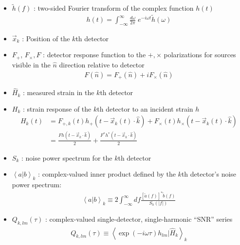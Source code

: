 \documentclass[twocolumn,prd,nofootinbib]{revtex4}
\newcommand\qmstateproduct[2]{\left\langle#1|#2\right\rangle}
\begin{document}
\begin{itemize}
\item 
$\tilde{h}(f)$ : two-sided Fourier transform of the complex function $h(t)$
\begin{eqnarray}
h(t) = \int_{-\infty}^{\infty} \frac{d \omega}{2\pi} \; e^{-i\omega t} \tilde{h}(\omega) 
\end{eqnarray}



\item 
$\vec{x}_k$ : Position of the $k$th detector

\item 
$F_{+}$, $F_{\times},F$ : detector response function  to the $+,\times$ polarizations for sources visible in the
  $\hat{n}$ direction relative to detector
\begin{eqnarray}
F(\hat{n}) = F_+(\hat{n}) +i F_\times(\hat{n})
\end{eqnarray}

\item 
$\hat{H}_k$ : measured strain in  the $k$th detector

\item 
$H_k$ : strain response of the $k$th detector to an incident strain $h$
\begin{align}
H_k(t) &=F_{+,k}(t) h_+(t-\vec{x}_k(t)\cdot \hat{k}) + F_\times(t) h_\times(t-\vec{x}_k(t)\cdot \hat{k}) \\
 &=  \frac{F h(t-\vec{x}_k\cdot \hat{k}) }{2} + \frac{F^*h^*(t-\vec{x}_k\cdot \hat{k})}{2}
\end{align}

\item 
$S_k$ : noise power spectrum for the $k$th detector

\item 
$\qmstateproduct{a}{b}_k$ : complex-valued inner product defined by the $k$th detector's noise power spectrum:
\begin{eqnarray}
\qmstateproduct{a}{b}_k \equiv 2 \int_{-\infty}^{\infty} df \frac{[\tilde{a}(f)]^*\tilde{b}(f)}{S_h(|f|) }
\end{eqnarray}


\item 
$Q_{k,lm}(\tau)$ : complex-valued single-detector, single-harmonic ``SNR'' series
\begin{eqnarray}
Q_{k,lm}(\tau) \equiv \qmstateproduct{\exp(-i\omega \tau) h_{lm}}{\hat{H}_k}_k
\end{eqnarray}

\end{itemize}
\end{document}

